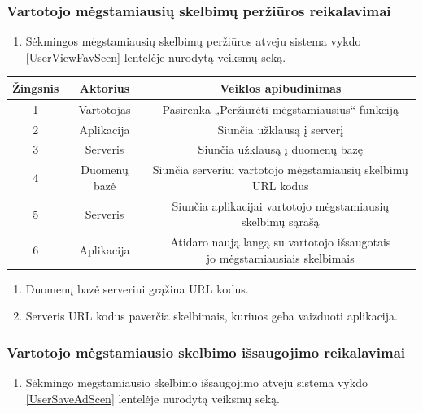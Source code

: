 \documentclass[12pt]{article}
\begin{document}
	\subsubsection{Vartotojo mėgstamiausių skelbimų peržiūros reikalavimai}
	\begin{enumerate}[labelindent=10pt,leftmargin=2.2cm]
		\item Sėkmingos mėgstamiausių skelbimų peržiūros atveju sistema vykdo \ref{UserViewFavScen} lentelėje nurodytą veiksmų seką.
	\end{enumerate}
		
		\begin{center}
		\begin{tabular}{ | c | c | c | }
			\hline
			Žingsnis & Aktorius     & Veiklos apibūdinimas \\ \hline
			1        & Vartotojas   & Pasirenka „Peržiūrėti mėgstamiausius“ funkciją \\ \hline
			2        & Aplikacija   & Siunčia užklausą į serverį \\ \hline
			3        & Serveris     & Siunčia užklausą į duomenų bazę \\ \hline
			4        & Duomenų bazė & Siunčia serveriui vartotojo mėgstamiausių skelbimų URL kodus \\ \hline
			5        & Serveris     & Siunčia aplikacijai vartotojo mėgstamiausių skelbimų sąrašą \\ \hline
			6        & Aplikacija   & \makecell{Atidaro naują langą su vartotojo išsaugotais \\ jo mėgstamiausiais skelbimais } \\ \hline
		\end{tabular}
		\end{center}
		\bigskip
		
	\begin{enumerate}[resume,labelindent=10pt,leftmargin=2.2cm]
		\item Duomenų bazė serveriui grąžina URL kodus.
		\item Serveris URL kodus paverčia skelbimais, kuriuos geba vaizduoti aplikacija.
	\end{enumerate}
	\pagebreak
	
	\subsubsection{Vartotojo mėgstamiausio skelbimo išsaugojimo reikalavimai}
	\begin{enumerate}[labelindent=10pt,leftmargin=2.2cm]
		\item Sėkmingo mėgstamiausio skelbimo išsaugojimo atveju sistema vykdo \ref{UserSaveAdScen} lentelėje nurodytą veiksmų seką.
	\end{enumerate}
		
\end{document}
